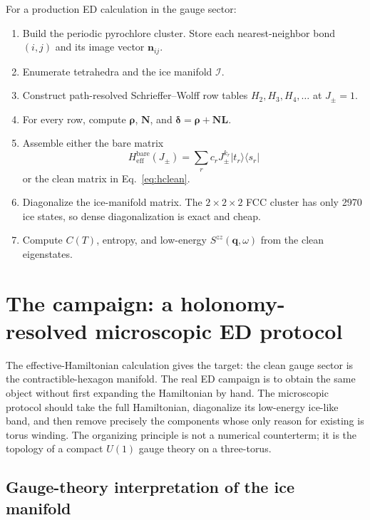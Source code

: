 \documentclass[11pt,letterpaper]{article}
\newcommand{\Jpm}{J_{\pm}}
\newcommand{\Heff}{H_{\mathrm{eff}}}
\newcommand{\bn}{\bm n}
\newcommand{\bN}{\bm N}
\newcommand{\bL}{\bm L}
\newcommand{\bq}{\bm q}
\newcommand{\brho}{\bm \rho}
\newcommand{\bdelta}{\bm \delta}
\newcommand{\ice}{\mathcal I}
\theoremstyle{plain}
\theoremstyle{definition}
\begin{document}
For a production ED calculation in the gauge sector:
\begin{enumerate}
\item Build the periodic pyrochlore cluster.  Store each nearest-neighbor
bond $(i,j)$ and its image vector $\bn_{ij}$.
\item Enumerate tetrahedra and the ice manifold $\ice$.
\item Construct path-resolved Schrieffer--Wolff row tables
$H_2,H_3,H_4,\ldots$ at $\Jpm=1$.
\item For every row, compute $\brho$, $\bN$, and
$\bdelta=\brho+\bN\bL$.
\item Assemble either the bare matrix
\[
\Heff^{\mathrm{bare}}(\Jpm)=
\sum_r c_r\Jpm^{k_r}|t_r\rangle\langle s_r|
\]
or the clean matrix in Eq.~\eqref{eq:hclean}.
\item Diagonalize the ice-manifold matrix.  The $2\times2\times2$ FCC
cluster has only 2970 ice states, so dense diagonalization is exact and
cheap.
\item Compute $C(T)$, entropy, and low-energy $S^{zz}(\bq,\omega)$ from the
clean eigenstates.
\end{enumerate}

\section{The campaign: a holonomy-resolved microscopic ED protocol}

The effective-Hamiltonian calculation gives the target: the clean gauge
sector is the contractible-hexagon manifold.  The real ED campaign is to
obtain the same object without first expanding the Hamiltonian by hand.  The
microscopic protocol should take the full Hamiltonian, diagonalize its
low-energy ice-like band, and then remove precisely the components whose only
reason for existing is torus winding.  The organizing principle is not a
numerical counterterm; it is the topology of a compact $U(1)$ gauge theory on
a three-torus.

\subsection{Gauge-theory interpretation of the ice manifold}
\end{document}
